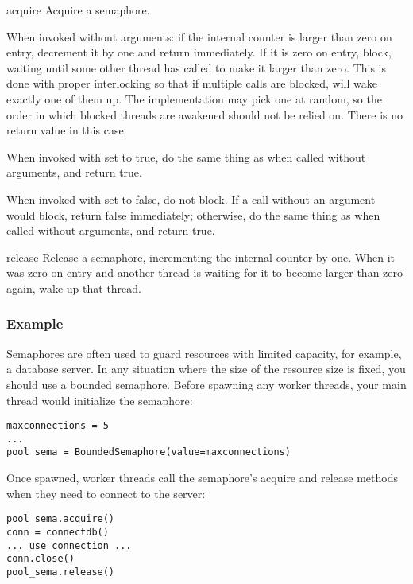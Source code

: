 \begin{methoddesc}{acquire}{}
Acquire a semaphore.

When invoked without arguments: if the internal counter is larger than
zero on entry, decrement it by one and return immediately.  If it is
zero on entry, block, waiting until some other thread has called
 to make it larger than zero.  This is done with
proper interlocking so that if multiple  calls are
blocked,  will wake exactly one of them up.  The
implementation may pick one at random, so the order in which blocked
threads are awakened should not be relied on.  There is no return
value in this case.

When invoked with  set to true, do the same thing as
when called without arguments, and return true.

When invoked with  set to false, do not block.  If a
call without an argument would block, return false immediately;
otherwise, do the same thing as when called without arguments, and
return true.
\end{methoddesc}

\begin{methoddesc}{release}{}
Release a semaphore,
incrementing the internal counter by one.  When it was zero on
entry and another thread is waiting for it to become larger
than zero again, wake up that thread.
\end{methoddesc}


\subsubsection{ Example \label{semaphore-examples}}

Semaphores are often used to guard resources with limited capacity, for
example, a database server.  In any situation where the size of the resource
size is fixed, you should use a bounded semaphore.  Before spawning any
worker threads, your main thread would initialize the semaphore:

\begin{verbatim}
maxconnections = 5
...
pool_sema = BoundedSemaphore(value=maxconnections)
\end{verbatim}

Once spawned, worker threads call the semaphore's acquire and release
methods when they need to connect to the server:

\begin{verbatim}
pool_sema.acquire()
conn = connectdb()
... use connection ...
conn.close()
pool_sema.release()
\end{verbatim}


